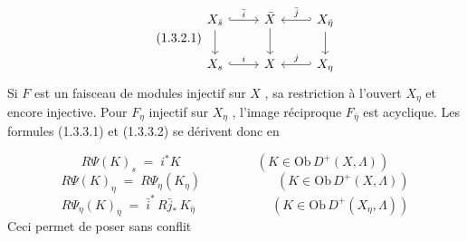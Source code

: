 \begin{equation}\tag{1.3.2.1}
\begin{tikzcd}
X_{\bar{s}} \arrow[r, hook, "\bar{i}"] \arrow[d] & \bar{X} \arrow[d] & X_{\bar{\eta}} \arrow[l, hook', "\bar{j}"'] \arrow[d] \\
X_{s} \arrow[r, hook, "i"] & X & X_{\eta} \arrow[l, hook', "j"']
\end{tikzcd}
\end{equation}
Si $F$ est un faisceau de modules injectif sur $X$ , sa restriction à l'ouvert $X_{\eta}$ et encore injective. Pour $F_{\eta}$ injectif sur $X_{\eta}$ , l'image réciproque $F_{\bar{\eta}}$ est acyclique. Les formules (1.3.3.1) et (1.3.3.2) se dérivent donc en

\begin{equation}\tag{2.1.2.1}
R\Psi(K)_{s} \;=\; i^{*} K \qquad\qquad\qquad (K \in \mathrm{Ob}\, D^{+}(X, \Lambda))
\end{equation}
\begin{equation}\tag{2.1.2.2}
R\Psi(K)_{\eta} \;=\; R\Psi_{\eta}(K_{\eta}) \qquad\qquad\qquad (K \in \mathrm{Ob}\, D^{+}(X, \Lambda))
\end{equation}
\begin{equation}\tag{2.1.2.3}
R\Psi_{\eta}(K)_{\bar{\eta}} \;=\; \bar{i}^{*}\, R\bar{j}_{*}\, K_{\bar{\eta}} \qquad\qquad\qquad (K \in \mathrm{Ob}\, D^{+}(X_{\eta}, \Lambda))
\end{equation}
Ceci permet de poser sans conflit

